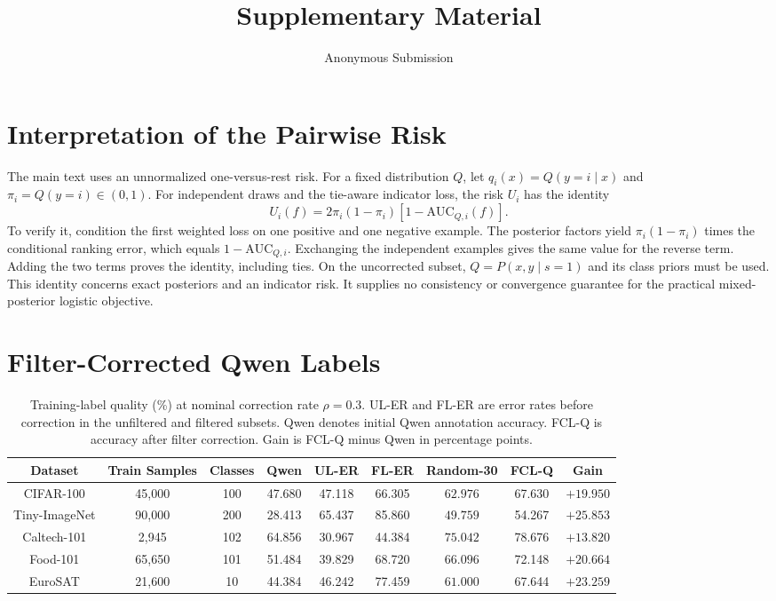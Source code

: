 \documentclass[10pt,twocolumn,letterpaper]{article}
\title{Supplementary Material}
\author{
    Anonymous Submission
}
\begin{document}
\maketitle
\appendix



\section{Interpretation of the Pairwise Risk}
The main text uses an unnormalized one-versus-rest risk. For a fixed distribution $Q$, let $q_i(x)=Q(y=i\mid x)$ and $\pi_i=Q(y=i)\in(0,1)$. For independent draws and the tie-aware indicator loss, the risk $U_i$ has the identity
\begin{equation}
U_i(f)=2\pi_i(1-\pi_i)[1-\mathrm{AUC}_{Q,i}(f)].
\end{equation}
To verify it, condition the first weighted loss on one positive and one negative example. The posterior factors yield $\pi_i(1-\pi_i)$ times the conditional ranking error, which equals $1-\mathrm{AUC}_{Q,i}$. Exchanging the independent examples gives the same value for the reverse term. Adding the two terms proves the identity, including ties. On the uncorrected subset, $Q=P(x,y\mid s=1)$ and its class priors must be used. This identity concerns exact posteriors and an indicator risk. It supplies no consistency or convergence guarantee for the practical mixed-posterior logistic objective.

\section{Filter-Corrected Qwen Labels}
\label{sec:supp-qwen-labels}

\begin{table}[t]
\caption{Training-label quality (\%) at nominal correction rate $\rho=0.3$. UL-ER and FL-ER are error rates before correction in the unfiltered and filtered subsets. Qwen denotes initial Qwen annotation accuracy. FCL-Q is accuracy after filter correction. Gain is FCL-Q minus Qwen in percentage points.}
\label{tab:supp-qwen-labels}
\centering
\scriptsize
\setlength{\tabcolsep}{2.5pt}
\begin{tabular*}{\textwidth}{@{\extracolsep{\fill}}ccccccccc}
\toprule
Dataset & Train Samples & Classes & Qwen & UL-ER & FL-ER & Random-30 & FCL-Q & Gain \\
\midrule
CIFAR-100 & 45,000 & 100 & 47.680 & 47.118 & 66.305 & $62.976$ & 67.630 & $+19.950$ \\
Tiny-ImageNet & 90,000 & 200 & 28.413 & 65.437 & 85.860 & $49.759$ & 54.267 & $+25.853$ \\
Caltech-101 & 2,945 & 102 & 64.856 & 30.967 & 44.384 & $75.042$  & 78.676 & $+13.820$ \\
Food-101 & 65,650 & 101 & 51.484 & 39.829 & 68.720 & $66.096$  & 72.148 & $+20.664$ \\
EuroSAT & 21,600 & 10 & 44.384 & 46.242 & 77.459 & $61.000$  & 67.644 & $+23.259$ \\
\bottomrule
\end{tabular*}
\end{table}
\end{document}
